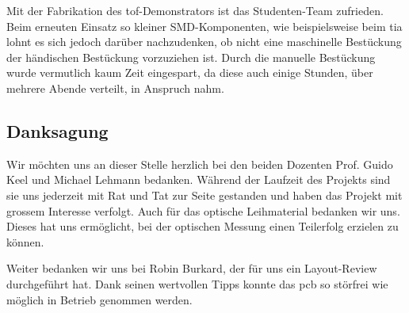 Mit der Fabrikation des \acrshort{tof}-Demonstrators ist das Studenten-Team zufrieden. Beim erneuten Einsatz so kleiner
SMD-Komponenten, wie beispielsweise beim \acrshort{tia} lohnt es sich jedoch darüber nachzudenken, ob nicht eine
maschinelle Bestückung der händischen Bestückung vorzuziehen ist. Durch die manuelle Bestückung wurde vermutlich kaum
Zeit eingespart, da diese auch einige Stunden, über mehrere Abende verteilt, in Anspruch nahm.

\subsection{Danksagung}

Wir möchten uns an dieser Stelle herzlich bei den beiden Dozenten Prof. Guido Keel und Michael Lehmann bedanken. Während
der Laufzeit des Projekts sind sie uns jederzeit mit Rat und Tat zur Seite gestanden und haben das Projekt mit grossem
Interesse verfolgt. Auch für das optische Leihmaterial bedanken wir uns. Dieses hat uns ermöglicht, bei der optischen
Messung einen Teilerfolg erzielen zu können.

Weiter bedanken wir uns bei Robin Burkard, der für uns ein Layout-Review durchgeführt hat. Dank seinen wertvollen Tipps
konnte das \acrshort{pcb} so störfrei wie möglich in Betrieb genommen werden.
